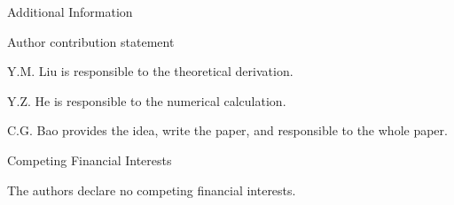 \documentclass[single-column,showpacs,groupedaddress]{revtex4}
\begin{document}
\newpage

Additional Information

Author contribution statement

Y.M. Liu is responsible to the theoretical derivation.

Y.Z. He is responsible to the numerical calculation.

C.G. Bao provides the idea, write the paper, and responsible to the whole
paper.

\bigskip Competing Financial Interests

The authors declare no competing financial interests.
\end{document}
